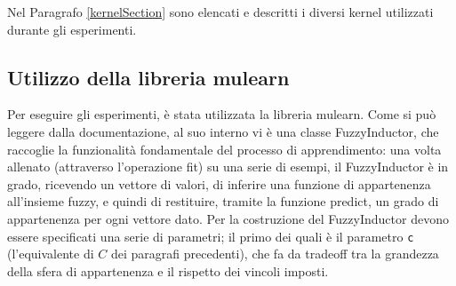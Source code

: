 \documentclass[12pt,a4paper]{report}
\begin{document}
Nel Paragrafo \ref{kernelSection} sono elencati e descritti i diversi kernel utilizzati durante gli esperimenti.

\subsection{Utilizzo della libreria mulearn}\label{FuzzifierSection}

Per eseguire gli esperimenti, è stata utilizzata la libreria mulearn\cite{mulearn}.
Come si può leggere dalla documentazione, al suo interno vi è una classe FuzzyInductor, che raccoglie la funzionalità fondamentale del processo di apprendimento: una volta allenato (attraverso l'operazione fit) su una serie di esempi, il FuzzyInductor è in grado, ricevendo un vettore di valori, di inferire una funzione di appartenenza all'insieme fuzzy, e quindi di restituire, tramite la funzione predict, un grado di appartenenza per ogni vettore dato.
Per la costruzione del FuzzyInductor devono essere specificati una serie di parametri; il primo dei quali è il parametro \texttt{c} (l'equivalente di $C$ dei paragrafi precedenti), che fa da tradeoff tra la grandezza della sfera di appartenenza e il rispetto dei vincoli imposti. 
\end{document}
